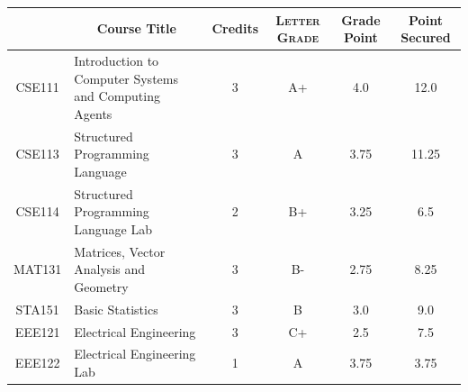 \documentclass[11pt]{article}
\newcommand*{\numtwo}[1]{\pgfmathprintnumber[
                    fixed, precision=2, fixed zerofill=true]{#1}}
\begin{document}
                \begin{center}
                    \renewcommand{\arraystretch}{1.08}
                    
                \begin{tabular}{|c|l|c|>{\scshape}c|c|c|}
                \hline  \rule[-1ex]{0pt}{3.5ex} {\centering{\bf Course Code}} &  \multicolumn{1}{c|}{\textbf{Course Title}}  & {\bf Credits} & {\bf Letter Grade} & {\bf Grade Point} & {\bf Point Secured}  \\ 
                \hline   CSE111 &  Introduction to Computer Systems and Computing Agents		 & 3 & A+ & 4.0 & 12.0 \\ %
                \hline   CSE113 &  Structured Programming Language		 & 3 & A & 3.75 & 11.25 \\ %
                \hline   CSE114 &  Structured Programming Language Lab		 & 2 & B+ & 3.25 & 6.5 \\ %
                \hline   MAT131 &  Matrices, Vector Analysis and Geometry		 & 3 & B- & 2.75 & 8.25 \\ %
                \hline   STA151 &  Basic Statistics		 & 3 & B & 3.0 & 9.0 \\ %
                \hline   EEE121 &  Electrical Engineering		 & 3 & C+ & 2.5 & 7.5 \\ %
                \hline   EEE122 &  Electrical Engineering Lab		 & 1 & A & 3.75 & 3.75 \\ %

\hline                %
                \end{tabular}
                \end{center}
                \renewcommand{\arraystretch}{1.03}
\end{document}
